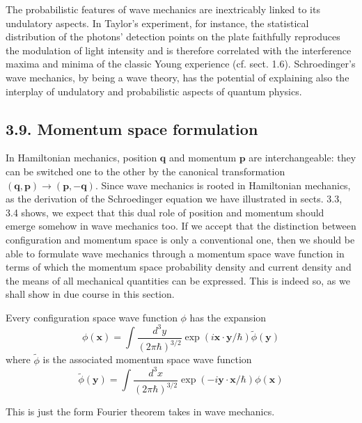 \documentclass{article}
\begin{document}
The probabilistic features of wave mechanics are inextricably linked to its undulatory aspects. In Taylor's experiment, for instance, the statistical distribution of the photons' detection points on the plate faithfully reproduces the modulation of light intensity and is therefore correlated with the interference maxima and minima of the classic Young experience (cf. sect. 1.6). Schroedinger's wave mechanics, by being a wave theory, has the potential of explaining also the interplay of undulatory and probabilistic aspects of quantum physics.

\subsection*{3.9. Momentum space formulation}

In Hamiltonian mechanics, position $\boldsymbol{q}$ and momentum $\boldsymbol{p}$ are interchangeable: they can be switched one to the other by the canonical transformation $(\boldsymbol{q}, \boldsymbol{p}) \rightarrow(\boldsymbol{p},-\boldsymbol{q})$. Since wave mechanics is rooted in Hamiltonian mechanics, as the derivation of the Schroedinger equation we have illustrated in sects. 3.3, 3.4 shows, we expect that this dual role of position and momentum should emerge somehow in wave mechanics too. If we accept that the distinction between configuration and momentum space is only a conventional one, then we should be able to formulate wave mechanics through a momentum space wave function in terms of which the momentum space probability density and current density and the means of all mechanical quantities can be expressed. This is indeed so, as we shall show in due course in this section.

Every configuration space wave function $\phi$ has the expansion
$$
\begin{equation*}
\phi(\boldsymbol{x})=\int \frac{d^{3} y}{(2 \pi \hbar)^{3 / 2}} \exp (i \boldsymbol{x} \cdot \boldsymbol{y} / \hbar) \tilde{\phi}(\boldsymbol{y}) \tag{3.9.1}
\end{equation*}
$$
where $\tilde{\phi}$ is the associated momentum space wave function
$$
\begin{equation*}
\tilde{\phi}(\boldsymbol{y})=\int \frac{d^{3} x}{(2 \pi \hbar)^{3 / 2}} \exp (-i \boldsymbol{y} \cdot \boldsymbol{x} / \hbar) \phi(\boldsymbol{x}) \tag{3.9.2}
\end{equation*}
$$

This is just the form Fourier theorem takes in wave mechanics.
\end{document}
